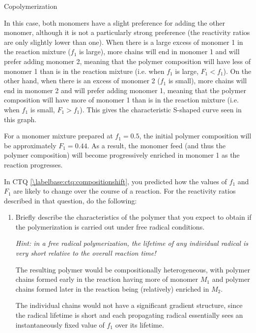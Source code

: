 \begin{activity}{Copolymerization}
\begin{exercises}
\begin{enumerate}
\begin{solution}{}
					In this case, both monomers have a slight preference for adding the other monomer, although it is not a particularly strong preference (the reactivity ratios are only slightly lower than one).  When there is a large excess of monomer 1 in the reaction mixture ($f_1$ is large), more chains will end in monomer 1 and will prefer adding monomer 2, meaning that the polymer composition will have less of monomer 1 than is in the reaction mixture (i.e. when $f_1$ is large, $F_1<f_1$).  On the other hand, when there is an excess of monomer 2 ($f_1$ is small), more chains will end in monomer 2 and will prefer adding monomer 1, meaning that the polymer composition will have more of monomer 1 than is in the reaction mixture (i.e. when $f_1$ is small, $F_1 > f_1$).  This gives the characteristic S-shaped curve seen in this graph.
					
					For a monomer mixture prepared at $f_1=0.5$, the initial polymer composition will be approximately $F_1=0.44$.  As a result, the monomer feed (and thus the polymer composition) will become progressively enriched in monomer 1 as the reaction progresses.
			\end{solution}
		\end{enumerate}
	
	\exercise In CTQ \ref{\labelbase:ctq:compositionshift}, you predicted how the values of $f_1$ and $F_1$ are likely to change over the course of a reaction.  For the reactivity ratios described in that question, do the following: \label{\labelbase:exc:compshift}
	
		\begin{enumerate}
			\item Briefly describe the characteristics of the polymer that you expect to obtain if the polymerization is carried out under free radical conditions.
			
				\emph{Hint: in a free radical polymerization, the lifetime of any individual radical is very short relative to the overall reaction time!}
			
				\begin{solution}{}
					The resulting polymer would be compositionally heterogeneous, with polymer chains formed early in the reaction having more of monomer $M_1$ and polymer chains formed later in the reaction being (relatively) enriched in $M_2$.
					
					The individual chains would not have a significant gradient structure, since the radical lifetime is short and each propagating radical essentially sees an instantaneously fixed value of $f_1$ over its lifetime.
				\end{solution}
				

\end{enumerate}
\end{exercises}
\end{activity}
